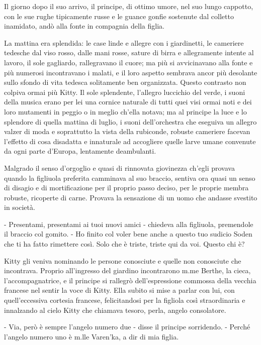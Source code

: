 Il giorno dopo il suo arrivo, il principe, di ottimo umore, nel suo lungo cappotto, con le sue rughe tipicamente russe e le guance gonfie sostenute dal colletto inamidato, andò alla fonte in compagnia della figlia. 

La mattina era splendida: le case linde e allegre con i giardinetti, le cameriere tedesche dal viso rosso, dalle mani rosse, sature di birra e allegramente intente al lavoro, il sole gagliardo, rallegravano il cuore; ma più si avvicinavano alla fonte e più numerosi incontravano i malati, e il loro aspetto sembrava ancor più desolante sullo sfondo di vita tedesca solitamente ben organizzata. Questo contrasto non colpiva ormai più Kitty. Il sole splendente, l'allegro luccichio del verde, i suoni della musica erano per lei una cornice naturale di tutti quei visi ormai noti e dei loro mutamenti in peggio o in meglio ch'ella notava; ma al principe la luce e lo splendore di quella mattina di luglio, i suoni dell'orchestra che eseguiva un allegro valzer di moda e soprattutto la vista della rubiconde, robuste cameriere facevan l'effetto di cosa disadatta e innaturale ad accogliere quelle larve umane convenute da ogni parte d'Europa, lentamente deambulanti. 

Malgrado il senso d'orgoglio e quasi di rinnovata giovinezza ch'egli provava quando la figliuola preferita camminava al suo braccio, sentiva ora quasi un senso di disagio e di mortificazione per il proprio passo deciso, per le proprie membra robuste, ricoperte di carne. Provava la sensazione di un uomo che andasse svestito in società. 

- Presentami, presentami ai tuoi nuovi amici - chiedeva alla figliuola, premendole il braccio col gomito. - Ho finito col voler bene anche a questo tuo sudicio Soden che ti ha fatto rimettere così. Solo che è triste, triste qui da voi. Questo chi è? 

Kitty gli veniva nominando le persone conosciute e quelle non conosciute che incontrava. Proprio all'ingresso del giardino incontrarono m.me Berthe, la cieca, l'accompagnatrice, e il principe si rallegrò dell'espressione commossa della vecchia francese nel sentir la voce di Kitty. Ella subito si mise a parlar con lui, con quell'eccessiva cortesia francese, felicitandosi per la figliola così straordinaria e innalzando al cielo Kitty che chiamava tesoro, perla, angelo consolatore. 

- Via, però è sempre l'angelo numero due - disse il principe sorridendo. - Perché l'angelo numero uno è m.lle Varen'ka, a dir di mia figlia. 

